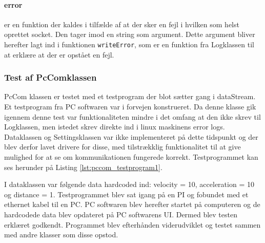 \paragraph{error} er en funktion der kaldes i tilfælde af at der sker en fejl i hvilken som helst oprettet socket. Den tager imod en string som argument. Dette argument bliver herefter lagt ind i funktionen \texttt{writeError}, som er en funktion fra Logklassen til at erklære at der er opstået en fejl.



\subsubsection{Test af PcComklassen}
PcCom klassen er testet med et testprogram der blot sætter gang i dataStream. Et testprogram fra PC softwaren var i forvejen konstrueret. Da denne klasse gik igennem denne test var funktionaliteten mindre i det omfang at den ikke skrev til Logklassen, men istedet skrev direkte ind i linux maskinens error logs. Dataklassen og Settingsklassen var ikke implementeret på dette tidspunkt og der blev derfor lavet drivere for disse, med tilstrækklig funktionalitet til at give mulighed for at se om kommunikationen fungerede korrekt. Testprogrammet kan ses herunder på Listing \ref{lst:pccom_testprogram1}.



I dataklassen var følgende data hardcoded ind: velocity = 10, acceleration = 10 og distance = 1. Testprogrammet blev sat igang på en PI og fobundet med et ethernet kabel til en PC. PC softwaren blev herefter startet på computeren og de hardcodede data blev opdateret på PC softwarens UI. Dermed blev testen erklæret godkendt. Programmet blev efterhånden viderudviklet og testet sammen med andre klasser som disse opstod.